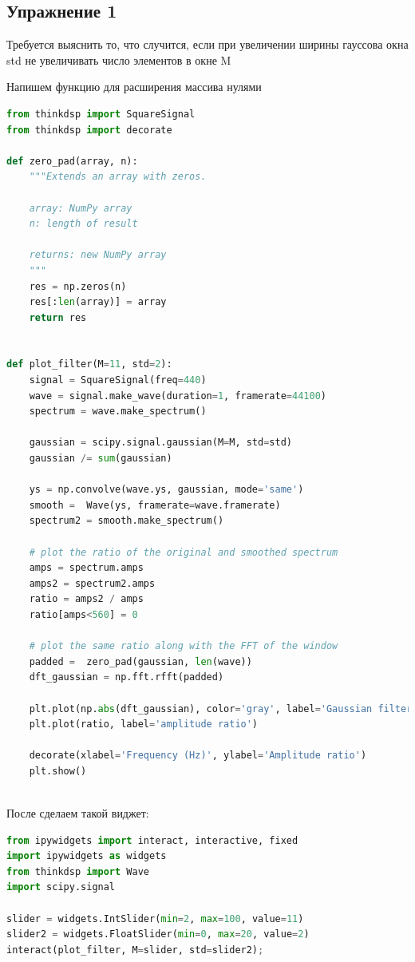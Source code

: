 \subsection{Упражнение 1}

Требуется выяснить то, что случится, если при увеличении ширины гауссова окна std не увеличивать число элементов в окне M

Напишем функцию для расширения массива нулями

\begin{lstlisting}[language=Python]
from thinkdsp import SquareSignal
from thinkdsp import decorate

def zero_pad(array, n):
    """Extends an array with zeros.

    array: NumPy array
    n: length of result

    returns: new NumPy array
    """
    res = np.zeros(n)
    res[:len(array)] = array
    return res


def plot_filter(M=11, std=2):
    signal = SquareSignal(freq=440)
    wave = signal.make_wave(duration=1, framerate=44100)
    spectrum = wave.make_spectrum()

    gaussian = scipy.signal.gaussian(M=M, std=std)
    gaussian /= sum(gaussian)

    ys = np.convolve(wave.ys, gaussian, mode='same')
    smooth =  Wave(ys, framerate=wave.framerate)
    spectrum2 = smooth.make_spectrum()

    # plot the ratio of the original and smoothed spectrum
    amps = spectrum.amps
    amps2 = spectrum2.amps
    ratio = amps2 / amps    
    ratio[amps<560] = 0

    # plot the same ratio along with the FFT of the window
    padded =  zero_pad(gaussian, len(wave))
    dft_gaussian = np.fft.rfft(padded)

    plt.plot(np.abs(dft_gaussian), color='gray', label='Gaussian filter')
    plt.plot(ratio, label='amplitude ratio')

    decorate(xlabel='Frequency (Hz)', ylabel='Amplitude ratio')
    plt.show()
    
\end{lstlisting}

После сделаем такой виджет:
\begin{lstlisting}[language=Python]
from ipywidgets import interact, interactive, fixed
import ipywidgets as widgets
from thinkdsp import Wave
import scipy.signal

slider = widgets.IntSlider(min=2, max=100, value=11)
slider2 = widgets.FloatSlider(min=0, max=20, value=2)
interact(plot_filter, M=slider, std=slider2);
\end{lstlisting}

